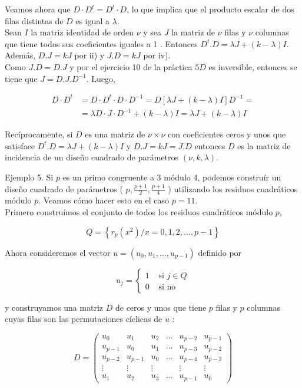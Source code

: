 \documentclass[10pt]{article}
\begin{document}
Veamos ahora que $D \cdot D^{t}=D^{t} \cdot D$, lo que implica que el producto escalar de dos filas distintas de $D$ es igual a $\lambda$.\\
Sean $I$ la matriz identidad de orden $\nu$ y sea $J$ la matriz de $\nu$ filas y $\nu$ columnas que tiene todos sus coeficientes iguales a 1 . Entonces $D^{t} . D=\lambda J+(k-\lambda) I$. Además, $D . J=k J$ por ii) y $J . D=k J$ por iv).\\
Como $J . D=D . J$ y por el ejercicio 10 de la práctica $5 D$ es inversible, entonces se tiene que $J=D . J . D^{-1}$. Luego,

$$
\begin{aligned}
D \cdot D^{t} & =D \cdot D^{t} \cdot D \cdot D^{-1}=D[\lambda J+(k-\lambda) I] D^{-1}= \\
& =\lambda D \cdot J \cdot D^{-1}+(k-\lambda) I=\lambda J+(k-\lambda) I
\end{aligned}
$$

Recíprocamente, si $D$ es una matriz de $\nu \times \nu$ con coeficientes ceros y unos que satisface $D^{t} . D=\lambda J+(k-\lambda) I$ y $D . J=k J=J . D$ entonces $D$ es la matriz de incidencia de un diseño cuadrado de parámetros $(\nu, k, \lambda)$.

Ejemplo 5. Si $p$ es un primo congruente a 3 módulo 4, podemos construír un diseño cuadrado de parámetros ( $p, \frac{p+1}{2}, \frac{p+1}{4}$ ) utilizando los residuos cuadráticos módulo $p$. Veamos cómo hacer esto en el caso $p=11$.\\
Primero construímos el conjunto de todos los residuos cuadráticos módulo $p$,

$$
Q=\left\{r_{p}\left(x^{2}\right) / x=0,1,2, \ldots, p-1\right\}
$$

Ahora consideremos el vector $u=\left(u_{0}, u_{1}, \ldots, u_{p-1}\right)$ definido por

$$
u_{j}= \begin{cases}1 & \text { si } j \in Q \\ 0 & \text { si no }\end{cases}
$$

y construyamos una matriz $D$ de ceros y unos que tiene $p$ filas y $p$ columnas cuyas filas son las permutaciones cíclicas de $u$ :

$$
D=\left(\begin{array}{cccccc}
u_{0} & u_{1} & u_{2} & \ldots & u_{p-2} & u_{p-1} \\
u_{p-1} & u_{0} & u_{1} & \ldots & u_{p-3} & u_{p-2} \\
u_{p-2} & u_{p-1} & u_{0} & \ldots & u_{p-4} & u_{p-3} \\
\vdots & \vdots & \vdots & & \vdots & \vdots \\
u_{1} & u_{2} & u_{3} & \ldots & u_{p-1} & u_{0}
\end{array}\right)
$$
\end{document}
